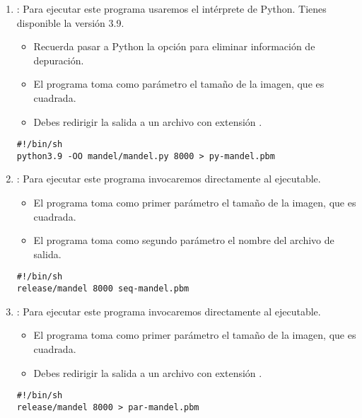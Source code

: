 \begin{enumerate}
  \item {}: Para ejecutar este programa usaremos el intérprete de Python.
        Tienes disponible la versión 3.9.

    \begin{itemize}
      \item Recuerda pasar a Python la opción  para eliminar información
            de depuración.
      \item El programa toma como parámetro el tamaño de la imagen, que es cuadrada.
      \item Debes redirigir la salida a un archivo con extensión .
    \end{itemize}

\begin{lstlisting}[style=terminal,title=runpy.sh]
#!/bin/sh
python3.9 -OO mandel/mandel.py 8000 > py-mandel.pbm
\end{lstlisting}

  \item {}: Para ejecutar este programa invocaremos directamente al
        ejecutable.
    \begin{itemize}
      \item El programa toma como primer parámetro el tamaño de la imagen, que es cuadrada.
      \item El programa toma como segundo parámetro el nombre del archivo de salida.
    \end{itemize}

\begin{lstlisting}[style=terminal,title=run-seq-mandel.sh]
#!/bin/sh
release/mandel 8000 seq-mandel.pbm
\end{lstlisting}

  \item {}: Para ejecutar este programa invocaremos directamente al
        ejecutable.
    \begin{itemize}
      \item El programa toma como primer parámetro el tamaño de la imagen, que es cuadrada.
      \item Debes redirigir la salida a un archivo con extensión .
    \end{itemize}

\begin{lstlisting}[style=terminal,title=run-par-mandel.sh]
#!/bin/sh
release/mandel 8000 > par-mandel.pbm
\end{lstlisting}
\end{enumerate}

